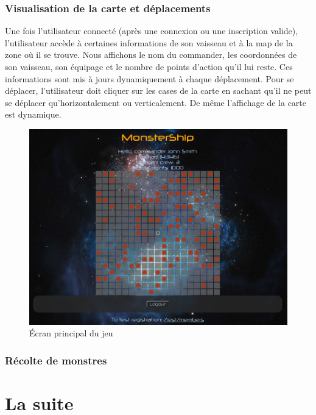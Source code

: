 \documentclass[a4paper,11pt]{report}
\begin{document}
    \subsection{Visualisation de la carte et déplacements}
      Une fois l'utilisateur connecté (après une connexion ou une inscription valide), l'utilisateur accède à certaines informations de son vaisseau et à la map de la zone où il se trouve.
      Nous affichons le nom du commander, les coordonnées de son vaisseau, son équipage et le nombre de points d'action qu'il lui reste. Ces informations sont mis à jours dynamiquement à chaque déplacement.
      Pour se déplacer, l'utilisateur doit cliquer sur les cases de la carte en sachant qu'il ne peut se déplacer qu'horizontalement ou verticalement. De même l'affichage de la carte est dynamique.
      \begin{figure}[H]
        \begin{center}
          \includegraphics[width=.8\textwidth]{images/home.png}
          \caption{Écran principal du jeu}
          \label{fig:ec_home}
        \end{center}
      \end{figure}

    \subsection{Récolte de monstres}

\chapter{La suite}
\end{document}

